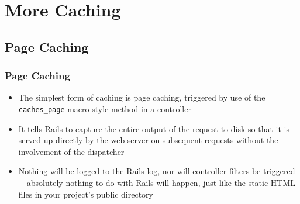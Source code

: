 \documentclass{beamer}
\begin{document}
\section{More Caching}
\subsection{Page Caching}
\begin{frame}[fragile]
\frametitle{Page Caching}
\begin{itemize}
\item The simplest form of caching is page caching, triggered by use of the \texttt{caches\_page}
macro-style method in a controller
\item It tells Rails to capture the entire output of the
request to disk so that it is served up directly by the web server on subsequent requests
without the involvement of the dispatcher
\item Nothing will be logged to the Rails log, nor
will controller filters be triggered—absolutely nothing to do with Rails will happen, just
like the static HTML files in your project’s public directory
\end{itemize}
\end{frame}
\end{document}
